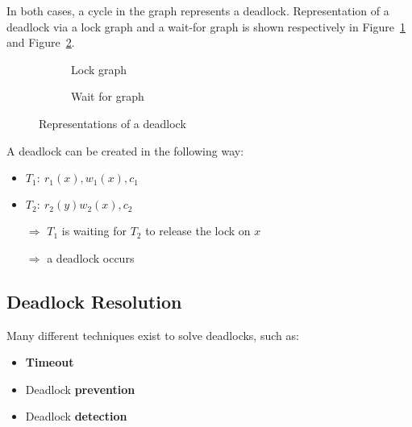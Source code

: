 \documentclass[english]{article}
\begin{document}
In both cases, a cycle in the graph represents a deadlock.
Representation of a deadlock via a lock graph and a wait-for graph is shown respectively in Figure~\ref{subfig:lock-graph} and Figure~\ref{subfig:wait-for-graph}.

\begin{figure}[htbp]
  \centering
  \bigskip
  \begin{subfigure}[b]{0.495\textwidth}
    \centering
    \caption{Lock graph}
    \label{subfig:lock-graph}
  \end{subfigure}
  \bigskip
  \begin{subfigure}[b]{0.495\textwidth}
    \centering
    \caption{Wait for graph}
    \label{subfig:wait-for-graph}
  \end{subfigure}
  \bigskip
  \caption{Representations of a deadlock}
  \label{fig:deadlock-representations}
\end{figure}

\bigskip
A deadlock can be created in the following way:

\begin{minipage}{0.496\textwidth}
  \bigskip
  \begin{itemize}
    \item \(T_1: \ r_1(x), w_1(x), c_1\)
    \item \(T_2: \ r_2(y) w_2(x), c_2\)
    \item[\(\Rightarrow\)] \(T_1\) is waiting for \(T_2\) to release the lock on \(x\)
    \item[\(\Rightarrow\)] a deadlock occurs
  \end{itemize}
\end{minipage}
\begin{minipage}{0.496\textwidth}
  \centering
\end{minipage}

\subsection{Deadlock Resolution}

Many different techniques exist to solve deadlocks, such as:

\begin{itemize}
  \item \textbf{Timeout}
  \item Deadlock \textbf{prevention}
  \item Deadlock \textbf{detection}
\end{itemize}
\end{document}
